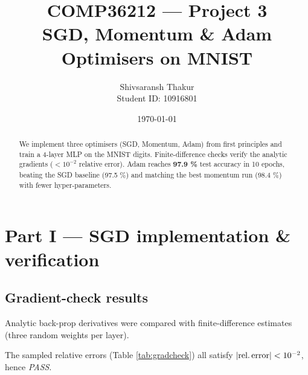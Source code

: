 \documentclass[11pt]{article}
\title{COMP36212 — Project 3 \\[4pt]%
       SGD, Momentum \& Adam Optimisers on MNIST}
\author{Shivsaransh Thakur \\[2pt]%
        Student ID: 10916801}
\date{\today}
\begin{document}
\maketitle

\begin{abstract}
We implement three optimisers (SGD, Momentum, Adam) from first
principles and train a 4-layer MLP on the MNIST digits.
Finite-difference checks verify the analytic gradients
(\(<10^{-2}\) relative error).
Adam reaches \textbf{97.9 \%} test accuracy in 10 epochs, beating the
SGD baseline (97.5 \%) and matching the best momentum run (98.4 \%) with
fewer hyper-parameters.
\end{abstract}

\section{Part I — SGD implementation \& verification}

\subsection{Gradient-check results}
Analytic back-prop derivatives were compared with finite-difference
estimates (three random weights per layer).\

The sampled relative errors (Table \ref{tab:gradcheck}) all satisfy
$\lvert\text{rel.\,error}\rvert<10^{-2}$, hence \emph{PASS}.
\end{document}
